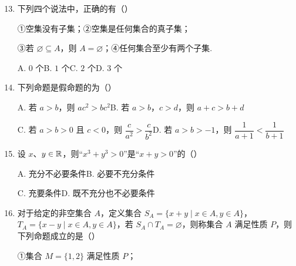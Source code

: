 \documentclass[a4paper,11pt]{article}
\begin{document}
\begin{enumerate}
\setcounter{enumi}{12}

\item 下列四个说法中，正确的有\mbox{（\quad）}

①空集没有子集；②空集是任何集合的真子集；

③若 $\varnothing\subseteq A$，则 $A=\varnothing$；④任何集合至少有两个子集.

\keepwithprev
A. $0$ 个\qquad B. $1$ 个\qquad C. $2$ 个\qquad D. $3$ 个

\ifanswer
\solbegin
{}
\solend
\fi

\item 下列命题是假命题的为\mbox{（\quad）}

\keepwithprev
A. 若 $a>b$，则 $ac^2>bc^2$\qquad B. 若 $a>b$，$c>d$，则 $a+c>b+d$

C. 若 $a>b>0$ 且 $c<0$，则 $\dfrac c{a^2}>\dfrac c{b^2}$\qquad D. 若 $a>b>-1$，则 $\dfrac1{a+1}<\dfrac1{b+1}$

\ifanswer
\solbegin
{}
\solend
\fi

\item 设 $x$、$y\in\mathbb{R}$，则“$x^3+y^3>0$”是“$x+y>0$”的\mbox{（\quad）}

\keepwithprev
A. 充分不必要条件\qquad B. 必要不充分条件

C. 充要条件\qquad D. 既不充分也不必要条件

\ifanswer
\solbegin
{}
\solend
\fi

\item 对于给定的非空集合 $A$，定义集合 $S_A=\{x+y\mid x\in A,y\in A\}$，$T_A=\{x-y\mid x\in A,y\in A\}$，若 $S_A\cap T_A=\varnothing$，则称集合 $A$ 满足性质 $P$，则下列命题成立的是\mbox{（\quad）}

①集合 $M=\{1,2\}$ 满足性质 $P$；


\end{enumerate}
\end{document}
